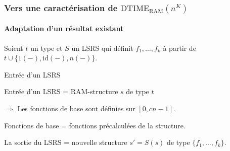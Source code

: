 \documentclass[10pt]{beamer}
\newcommand{\dtimeram}{\text{DTIME}_{\text{RAM}}\left( n^K \right)}
\begin{document}
\begin{frame}
\begin{exemple}
				
		\end{exemple}
	\end{frame}
	
	
	
	
	
	\begin{frame}
		\frametitle{Vers une caractérisation de $\dtimeram$}
		\framesubtitle{Adaptation d'un résultat existant}
		
		Soient $t$ un type et $S$ un LSRS qui définit $f_1, \dots, f_k$ à partir de $t \cup \{1(-), \text{id}(-), n(-) \}$. 
		
		\begin{block}{Entrée d'un LSRS}	
			
			Entrée d'un LSRS = RAM-structure $s$ de type $t$
			
			$\Rightarrow$ Les fonctions de base sont définies sur $[0, cn-1]$.
			
			Fonctions de base = fonctions précalculées de la structure.
			
			La sortie du LSRS = nouvelle structure $s' = S(s)$ de type $\{f_1, \dots, f_k\}$.
		\end{block}
		
	\end{frame}
	
\end{document}
